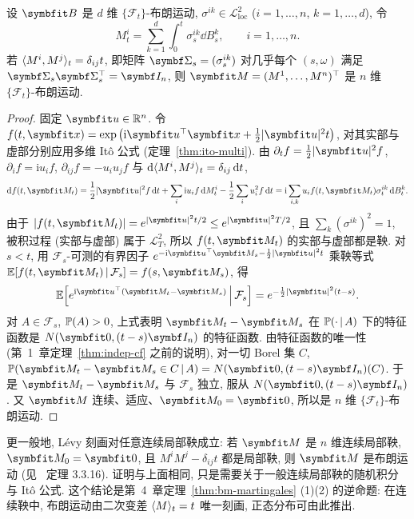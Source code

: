 \begin{theorem}[L\'evy 刻画]\label{thm:levy-char}
设 $\rvec{B}$ 是 $d$ 维 $\{\mathcal{F}_t\}$-布朗运动, $\sigma^{ik}\in\mathscr{L}^2_{\mathrm{loc}}$ ($i=1,\dots,n$, $k=1,\dots,d$), 令
\[
M^i_t=\sum_{k=1}^d\int_0^t\sigma^{ik}_s\dd B^k_s,\qquad i=1,\dots,n.
\]
若 $\ip{M^i,M^j}_t=\delta_{ij}t$, 即矩阵 $\mat{\Sigma}_s=(\sigma^{ik}_s)$ 对几乎每个 $(s,\omega)$ 满足 $\mat{\Sigma}_s\mat{\Sigma}_s^\T=\mat{I}_n$, 则 $\rvec{M}=(M^1,\dots,M^n)^\T$ 是 $n$ 维 $\{\mathcal{F}_t\}$-布朗运动.
\end{theorem}

\begin{proof}
固定 $\rvec{u}\in\R^n$. 令 $f(t,\rvec{x})=\exp\big(\mathrm{i}\rvec{u}^\T\rvec{x}+\frac{1}{2}\abs{\rvec{u}}^2t\big)$, 对其实部与虚部分别应用多维 It\^o 公式 (定理~\ref{thm:ito-multi}). 由 $\partial_tf=\frac{1}{2}\abs{\rvec{u}}^2f$, $\partial_if=\mathrm{i}u_if$, $\partial_{ij}f=-u_iu_jf$ 与 $\dd\ip{M^i,M^j}_t=\delta_{ij}\dd t$,
\[
\dd f(t,\rvec{M}_t)=\frac{1}{2}\abs{\rvec{u}}^2f\dd t+\sum_i\mathrm{i}u_if\dd M^i_t-\frac{1}{2}\sum_iu_i^2f\dd t=\mathrm{i}\sum_{i,k}u_if(t,\rvec{M}_t)\sigma^{ik}_t\dd B^k_t.
\]
由于 $\abs{f(t,\rvec{M}_t)}=e^{\abs{\rvec{u}}^2t/2}\le e^{\abs{\rvec{u}}^2T/2}$, 且 $\sum_k(\sigma^{ik})^2=1$, 被积过程 (实部与虚部) 属于 $\mathscr{L}^2_T$, 所以 $f(t,\rvec{M}_t)$ 的实部与虚部都是鞅. 对 $s<t$, 用 $\mathcal{F}_s$-可测的有界因子 $e^{-\mathrm{i}\rvec{u}^\T\rvec{M}_s-\frac{1}{2}\abs{\rvec{u}}^2t}$ 乘鞅等式 $\E[f(t,\rvec{M}_t)\,|\,\mathcal{F}_s]=f(s,\rvec{M}_s)$, 得
\[
\E\Big[e^{\mathrm{i}\rvec{u}^\T(\rvec{M}_t-\rvec{M}_s)}\,\Big|\,\mathcal{F}_s\Big]=e^{-\frac{1}{2}\abs{\rvec{u}}^2(t-s)}.
\]
对 $A\in\mathcal{F}_s$, $\P(A)>0$, 上式表明 $\rvec{M}_t-\rvec{M}_s$ 在 $\P(\cdot\,|\,A)$ 下的特征函数是 $N(\rvec{0},(t-s)\mat{I}_n)$ 的特征函数. 由特征函数的唯一性 (第~1~章定理~\ref{thm:indep-cf} 之前的说明), 对一切 Borel 集 $C$, $\P(\rvec{M}_t-\rvec{M}_s\in C\,|\,A)=N(\rvec{0},(t-s)\mat{I}_n)(C)$. 于是 $\rvec{M}_t-\rvec{M}_s$ 与 $\mathcal{F}_s$ 独立, 服从 $N(\rvec{0},(t-s)\mat{I}_n)$. 又 $\rvec{M}$ 连续、适应、$\rvec{M}_0=\rvec{0}$, 所以是 $n$ 维 $\{\mathcal{F}_t\}$-布朗运动.
\end{proof}

更一般地, L\'evy 刻画对任意连续局部鞅成立: 若 $\rvec{M}$ 是 $n$ 维连续局部鞅, $\rvec{M}_0=\rvec{0}$, 且 $M^iM^j-\delta_{ij}t$ 都是局部鞅, 则 $\rvec{M}$ 是布朗运动 (见~\cite{karatzas} 定理 3.3.16). 证明与上面相同, 只是需要关于一般连续局部鞅的随机积分与 It\^o 公式. 这个结论是第~4~章定理~\ref{thm:bm-martingales} (1)(2) 的逆命题: 在连续鞅中, 布朗运动由二次变差 $\ip{M}_t=t$ 唯一刻画, 正态分布可由此推出.

